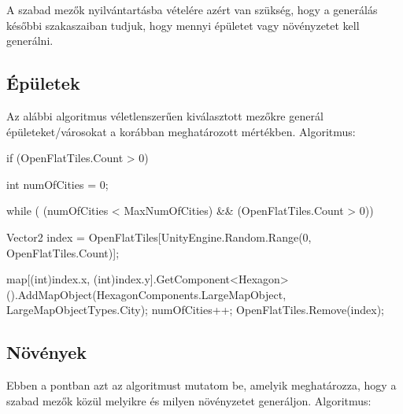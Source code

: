 \noindent A szabad mezők nyilvántartásba vételére azért van szükség, hogy a generálás későbbi szakaszaiban tudjuk, hogy mennyi épületet vagy növényzetet kell generálni.

\subsection{Épületek}
Az alábbi algoritmus véletlenszerűen kiválasztott mezőkre generál épületeket/városokat a korábban meghatározott mértékben.
\newline
\newline Algoritmus:

\begin{cpp}
if (OpenFlatTiles.Count > 0)
{
   int numOfCities = 0;
    
   while ( (numOfCities < MaxNumOfCities) && (OpenFlatTiles.Count > 0))
   {
      Vector2 index = OpenFlatTiles[UnityEngine.Random.Range(0, 
      OpenFlatTiles.Count)];

      map[(int)index.x, (int)index.y].GetComponent<Hexagon>
      ().AddMapObject(HexagonComponents.LargeMapObject, 
      LargeMapObjectTypes.City);
      numOfCities++;
      OpenFlatTiles.Remove(index);
   }
}
\end{cpp}

\subsection{Növények}
Ebben a pontban azt az algoritmust mutatom be, amelyik meghatározza, hogy a szabad mezők közül melyikre és milyen növényzetet generáljon.
\newline
\newline Algoritmus:

